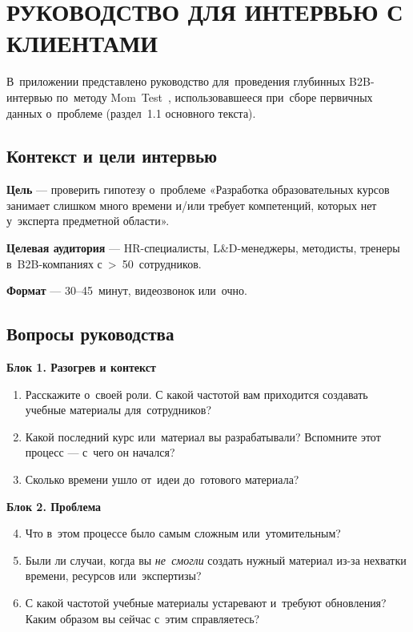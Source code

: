 \chapter{РУКОВОДСТВО ДЛЯ ИНТЕРВЬЮ С КЛИЕНТАМИ}

В~приложении представлено руководство для~проведения глубинных B2B-интервью
по~методу Mom~Test~\cite{fitzpatrick_mom_test_2013},
использовавшееся при~сборе первичных данных о~проблеме
(раздел~1.1 основного текста).

\section*{Контекст и цели интервью}

\textbf{Цель} — проверить гипотезу о~проблеме
«Разработка образовательных курсов занимает слишком много времени и/или
требует компетенций, которых нет у~эксперта предметной области».

\textbf{Целевая аудитория} — HR-специалисты, L\&D-менеджеры,
методисты, тренеры в~B2B-компаниях с~>~50~сотрудников.

\textbf{Формат} — 30–45~минут, видеозвонок или~очно.

\section*{Вопросы руководства}

\textbf{Блок 1. Разогрев и контекст}
\begin{enumerate}
  \item Расскажите о~своей роли. С какой частотой вам приходится создавать
    учебные материалы для~сотрудников?
  \item Какой последний курс или~материал вы разрабатывали?
    Вспомните этот процесс — с~чего он начался?
  \item Сколько времени ушло от~идеи до~готового материала?
\end{enumerate}

\textbf{Блок 2. Проблема}
\begin{enumerate}
  \setcounter{enumi}{3}
  \item Что в~этом процессе было самым сложным или~утомительным?
  \item Были ли случаи, когда вы \textit{не~смогли} создать нужный
    материал из-за нехватки времени, ресурсов или~экспертизы?
  \item С какой частотой учебные материалы устаревают и~требуют обновления?
    Каким образом вы сейчас с~этим справляетесь?
\end{enumerate}

